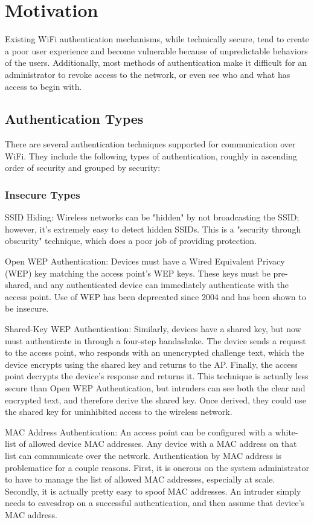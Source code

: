 \section{Motivation}
\label{section:motivation}
Existing WiFi authentication mechanisms, while technically secure, tend to create a poor user
experience and become vulnerable because of unpredictable behaviors of the users. Additionally,
most methods of authentication make it difficult for an administrator to revoke access to the
network, or even see who and what has access to begin with.

\subsection{Authentication Types}
There are several authentication techniques supported for communication over WiFi. They include
the following types of authentication, roughly in ascending order of security and grouped by security:
\cite{WifiAuthenticationTypes} \cite{wiki:WirelessSecurity}

\subsubsection{Insecure Types}
\begin{description}
\item{SSID Hiding:} Wireless networks can be "hidden" by not broadcasting the SSID; however,
it's extremely easy to detect hidden SSIDs. This is a "security through obscurity" technique,
which does a poor job of providing protection.
\item{Open WEP Authentication:} Devices must have a Wired Equivalent Privacy (WEP) key matching
the access point's WEP keys. These keys must be pre-shared, and any authenticated device can
immediately authenticate with the access point. Use of WEP has been deprecated since 2004 and has
been shown to be insecure.
\item{Shared-Key WEP Authentication:} Similarly, devices have a shared key, but now must
authenticate in through a four-step handashake. The device sends a request to the access point,
who responds with an unencrypted challenge text, which the device encrypts using the shared key
and returns to the AP. Finally, the access point decrypts the device's response and returns it.
This technique is actually less secure than Open WEP Authentication, but intruders can see both
the clear and encrypted text, and therefore derive the shared key. Once derived, they could use
the shared key for uninhibited access to the wireless network.
\item{MAC Address Authentication:} An access point can be configured with a white-list of allowed
device MAC addresses. Any device with a MAC address on that list can communicate over the network.
Authentication by MAC address is problematice for a couple reasons. First, it is onerous on the
system administrator to have to manage the list of allowed MAC addresses, especially at scale.
Secondly, it is actually pretty easy to spoof MAC addresses. An intruder simply needs to eavesdrop
on a successful authentication, and then assume that device's MAC address.
\end{description}

